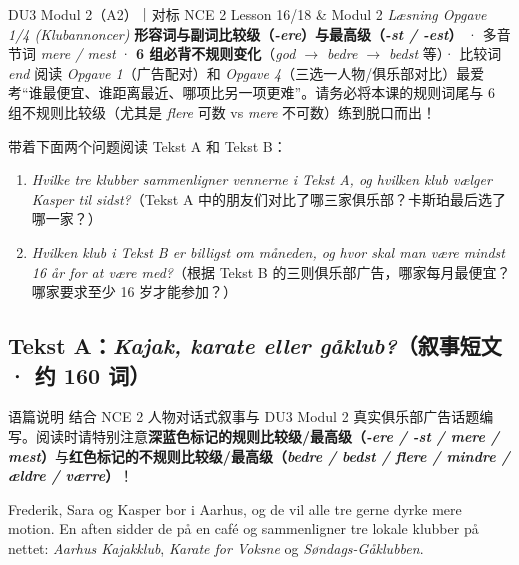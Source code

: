 {DU3 Modul 2（A2）｜对标 NCE 2 Lesson 16/18 \& Modul 2 \textit{Læsning Opgave 1/4 (Klubannoncer)}}
{\textbf{形容词与副词比较级（\textit{-ere}）与最高级（\textit{-st / -est}）} · 多音节词 \textit{mere / mest} · \textbf{6 组必背不规则变化}（\textit{god $\rightarrow$ bedre $\rightarrow$ bedst} 等）· 比较词 \textit{end}}
{阅读 \textit{Opgave 1}（广告配对）和 \textit{Opgave 4}（三选一人物/俱乐部对比）最爱考“谁最便宜、谁距离最近、哪项比另一项更难”。请务必将本课的规则词尾与 6 组不规则比较级（尤其是 \textit{flere} 可数 vs \textit{mere} 不可数）练到脱口而出！}

\begin{foerduleaeser}
带着下面两个问题阅读 Tekst A 和 Tekst B：
\begin{enumerate}
  \item \textit{Hvilke tre klubber sammenligner vennerne i Tekst A, og hvilken klub vælger Kasper til sidst?}（Tekst A 中的朋友们对比了哪三家俱乐部？卡斯珀最后选了哪一家？）
  \item \textit{Hvilken klub i Tekst B er billigst om måneden, og hvor skal man være mindst 16 år for at være med?}（根据 Tekst B 的三则俱乐部广告，哪家每月最便宜？哪家要求至少 16 岁才能参加？）
\end{enumerate}
\end{foerduleaeser}


\subsection*{Tekst A：\textit{Kajak, karate eller gåklub?}（叙事短文 · 约 160 词）}

\begin{tipbox}{语篇说明}
结合 NCE 2 人物对话式叙事与 DU3 Modul 2 真实俱乐部广告话题编写。阅读时请特别注意\textbf{\color{NCDNavy}深蓝色标记的规则比较级/最高级（\textit{-ere / -st / mere / mest}）}与\textbf{\color{NCDRed}红色标记的不规则比较级/最高级（\textit{bedre / bedst / flere / mindre / ældre / værre}）}！
\end{tipbox}

Frederik, Sara og Kasper bor i Aarhus, og de vil alle tre gerne dyrke mere motion. En aften sidder de på en café og sammenligner tre lokale klubber på nettet: \textit{Aarhus Kajakklub}, \textit{Karate for Voksne} og \textit{Søndags-Gåklubben}.

